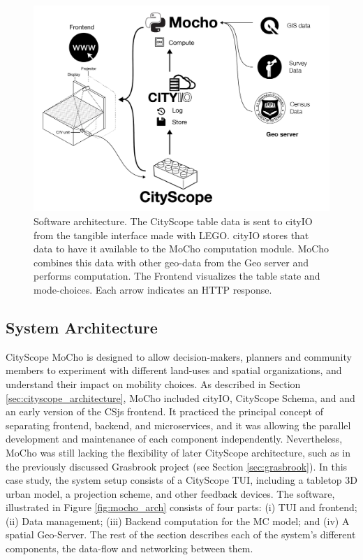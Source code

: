 {    \begin{figure}[!htb]
        \centering
        \includegraphics[width=.75\linewidth]{chapters/prediction/mocho/figures/mocho0.png}
        \caption{Software architecture. The CityScope table data is sent to cityIO from the tangible interface made with LEGO. cityIO stores that data to have it available to the MoCho computation module. MoCho combines this data with other geo-data from the Geo server and performs computation. The Frontend visualizes the table state and mode-choices. Each arrow indicates an HTTP response.}
        \label{fig:mocho_arch}
    \end{figure}


    \subsection{System Architecture}

    {
        CityScope MoCho is designed to allow decision-makers, planners and community members to experiment with different land-uses and spatial organizations, and understand their impact on mobility choices. As described in Section \eqref{sec:cityscope_architecture}, MoCho included cityIO, CityScope Schema, and and an early version of the CSjs frontend. It practiced the principal concept of separating frontend, backend, and microservices, and it was allowing the parallel development and maintenance of each component independently. Nevertheless, MoCho was still lacking the flexibility of later CityScope architecture, such as in the previously discussed Grasbrook project (see Section \eqref{sec:grasbrook}).
        \newline
        In this case study, the system setup consists of a CityScope TUI, including a tabletop 3D urban model, a projection scheme, and other feedback devices. The software, illustrated in Figure \eqref{fig:mocho_arch}
        consists of four parts: (i) TUI and frontend; (ii) Data management; (iii) Backend computation for the MC model; and (iv) A spatial Geo-Server. The rest of the section describes each of the system's different components, the data-flow and networking between them.




}}
